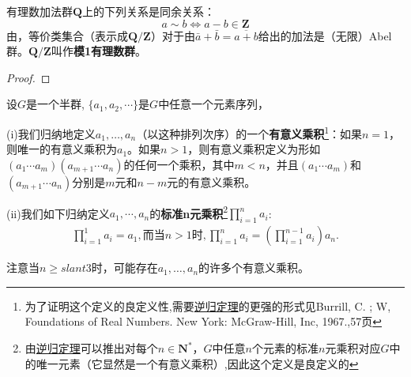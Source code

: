 \documentclass[../../main.tex]{subfiles}
\begin{document}
\begin{example}
有理数加法群$\boldsymbol{Q}$上的下列关系是同余关系：
\[a \sim b \Longleftrightarrow a - b \in \boldsymbol{Z}\]
由，等价类集合（表示成$\boldsymbol{Q}/\boldsymbol{Z}$）对于由$\bar{a} + \bar{b} = \overline{a + b}$给出的加法是（无限）Abel群。$\boldsymbol{Q}/\boldsymbol{Z}$叫作\textbf{模1有理数群}。
\end{example}
\begin{proof}

\end{proof}

\begin{definition}[有意义乘积和标准n元乘积]\label{definition:有意义乘积和标准n元乘积}
设$G$是一个半群, $\{a_1,a_2, \cdots\}$是$G$中任意一个元素序列，

(i)我们归纳地定义$a_1, \dots, a_n$（以这种排列次序）的一个\textbf{有意义乘积}\footnote{为了证明这个定义的良定义性,需要\hyperref[Set Theory-theorem:逆归定理]{逆归定理}的更强的形式见Burrill, C. ; W, Foundations of Real Numbers. New York: McGraw-Hill, Inc, 1967.,57页}：如果$n = 1$，则唯一的有意义乘积为$a_1$。如果$n > 1$，则有意义乘积定义为形如$(a_1 \cdots a_m)(a_{m + 1} \cdots a_n)$的任何一个乘积，其中$m < n$，并且$(a_1 \cdots a_m)$和$(a_{m + 1} \cdots a_n)$分别是$m$元和$n - m$元的有意义乘积。

(ii)我们如下归纳定义$a_1,\cdots,a_n$的\textbf{标准n元乘积}\footnote{由\hyperref[Set Theory-theorem:逆归定理]{逆归定理}可以推出对每个$n \in \boldsymbol{N}^*$，$G$中任意$n$个元素的标准$n$元乘积对应$G$中的唯一元素（它显然是一个有意义乘积）,因此这个定义是良定义的}$\prod_{i=1}^n{a_i}$:
\begin{align*}
\prod_{i=1}^1{a_i}=a_1,\text{而当}n>1\text{时},\prod_{i=1}^n{a_i}=\left( \prod_{i=1}^{n-1}{a_i} \right) a_n.
\end{align*}
\end{definition}
\begin{remark}
注意当$n \geqslant slant 3$时，可能存在$a_1, \dots, a_n$的许多个有意义乘积。
\end{remark}
\end{document}
